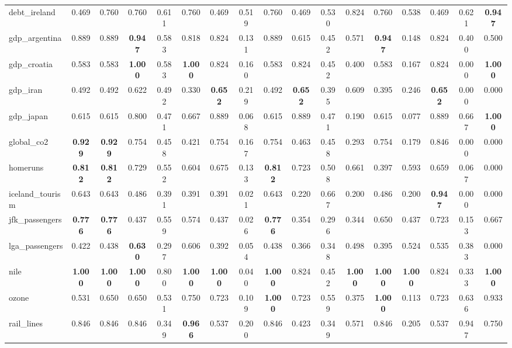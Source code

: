 \documentclass[11pt,a4paper]{article}
\begin{document}
\begin{table}
{\begin{tabular}{lcccccccccccccccc}
debt\_ireland & 0.469 & 0.760 & 0.760 & 0.611 & 0.760 & 0.469 & 0.519 & 0.760 & 0.469 & 0.530 & 0.824 & 0.760 & 0.538 & 0.469 & 0.621 & \textbf{0.947} \\
gdp\_argentina & 0.889 & 0.889 & \textbf{0.947} & 0.583 & 0.818 & 0.824 & 0.131 & 0.889 & 0.615 & 0.452 & 0.571 & \textbf{0.947} & 0.148 & 0.824 & 0.400 & 0.500 \\
gdp\_croatia & 0.583 & 0.583 & \textbf{1.000} & 0.583 & \textbf{1.000} & 0.824 & 0.160 & 0.583 & 0.824 & 0.452 & 0.400 & 0.583 & 0.167 & 0.824 & 0.000 & \textbf{1.000} \\
gdp\_iran & 0.492 & 0.492 & 0.622 & 0.492 & 0.330 & \textbf{0.652} & 0.219 & 0.492 & \textbf{0.652} & 0.395 & 0.609 & 0.395 & 0.246 & \textbf{0.652} & 0.000 & 0.000 \\
gdp\_japan & 0.615 & 0.615 & 0.800 & 0.471 & 0.667 & 0.889 & 0.068 & 0.615 & 0.889 & 0.471 & 0.190 & 0.615 & 0.077 & 0.889 & 0.667 & \textbf{1.000} \\
global\_co2 & \textbf{0.929} & \textbf{0.929} & 0.754 & 0.458 & 0.421 & 0.754 & 0.167 & 0.754 & 0.463 & 0.458 & 0.293 & 0.754 & 0.179 & 0.846 & 0.000 & 0.000 \\
homeruns & \textbf{0.812} & \textbf{0.812} & 0.729 & 0.552 & 0.604 & 0.675 & 0.133 & \textbf{0.812} & 0.723 & 0.508 & 0.661 & 0.397 & 0.593 & 0.659 & 0.067 & 0.000 \\
iceland\_tourism & 0.643 & 0.643 & 0.486 & 0.391 & 0.391 & 0.391 & 0.021 & 0.643 & 0.220 & 0.667 & 0.200 & 0.486 & 0.200 & \textbf{0.947} & 0.000 & 0.000 \\
jfk\_passengers & \textbf{0.776} & \textbf{0.776} & 0.437 & 0.559 & 0.574 & 0.437 & 0.026 & \textbf{0.776} & 0.354 & 0.296 & 0.344 & 0.650 & 0.437 & 0.723 & 0.153 & 0.667 \\
lga\_passengers & 0.422 & 0.438 & \textbf{0.630} & 0.297 & 0.606 & 0.392 & 0.054 & 0.438 & 0.366 & 0.348 & 0.498 & 0.395 & 0.524 & 0.535 & 0.383 & 0.000 \\
nile & \textbf{1.000} & \textbf{1.000} & \textbf{1.000} & 0.800 & \textbf{1.000} & \textbf{1.000} & 0.040 & \textbf{1.000} & 0.824 & 0.452 & \textbf{1.000} & \textbf{1.000} & \textbf{1.000} & 0.824 & 0.333 & \textbf{1.000} \\
ozone & 0.531 & 0.650 & 0.650 & 0.531 & 0.750 & 0.723 & 0.109 & \textbf{1.000} & 0.723 & 0.559 & 0.375 & \textbf{1.000} & 0.113 & 0.723 & 0.636 & 0.933 \\
rail\_lines & 0.846 & 0.846 & 0.846 & 0.349 & \textbf{0.966} & 0.537 & 0.200 & 0.846 & 0.423 & 0.349 & 0.571 & 0.846 & 0.205 & 0.537 & 0.947 & 0.750 \\

\end{tabular}}
\end{table}
\end{document}
